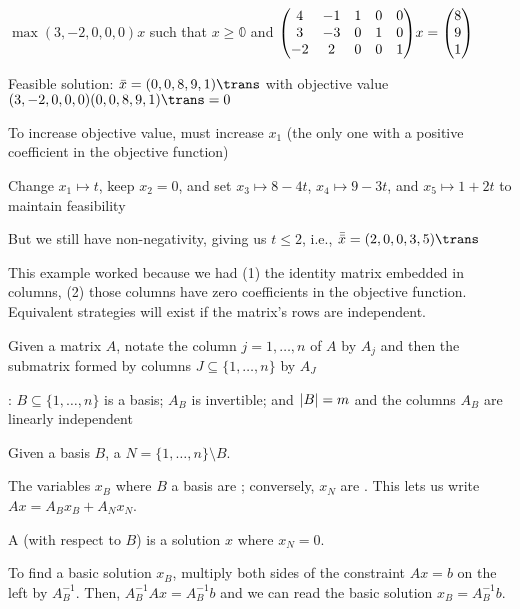 \begin{example}
  $\max (3,-2,0,0,0)x$ such that $x \geq \mathbb 0$
  and $\mqty(4&-1&1&0&0\\3&-3&0&1&0\\-2&2&0&0&1)x=\mqty(8\\9\\1)$
\end{example}
\begin{sol}
  Feasible solution: $\bar x = (0,0,8,9,1)\trans$ with objective value
  $(3,-2,0,0,0)(0,0,8,9,1)\trans = 0$

  To increase objective value, must increase $x_1$ (the only one
  with a positive coefficient in the objective function)

  Change $x_1 \mapsto t$, keep $x_2 = 0$, and set
  $x_3 \mapsto 8-4t$, $x_4 \mapsto 9-3t$, and $x_5 \mapsto 1+2t$
  to maintain feasibility

  But we still have non-negativity, giving us $t \leq 2$, i.e.,
  $\bar{\bar x} = (2,0,0,3,5)\trans$
\end{sol}

This example worked because we had (1) the identity matrix embedded
in columns, (2) those columns have zero coefficients in the
objective function.
Equivalent strategies will exist if the matrix's rows are
independent.

\begin{notation}
  Given a matrix $A$, notate the column $j = 1,\dotsc,n$ of $A$ by
  $A_j$ and then the submatrix formed by columns
  $J \subseteq \{1,\dotsc,n\}$ by $A_J$
\end{notation}

\begin{prop}
  \Tfae: $B \subseteq \{1,\dotsc,n\}$ is a basis;
  $A_B$ is invertible; and
  $\abs{B} = m$ and the columns $A_B$ are linearly independent
\end{prop}

\begin{defn}
  Given a basis $B$, a 
  $N = \{1,\dotsc,n\}\setminus B$.

  The variables $x_B$ where $B$ a basis are ;
  conversely, $x_N$ are .
  This lets us write $Ax = A_Bx_B + A_Nx_N$.

  A  (with respect to $B$) is a solution $x$ where $x_N = 0$.
\end{defn}

To find a basic solution $x_B$, multiply both sides of the
constraint $Ax = b$ on the left by $A_B^{-1}$. Then,
$A_B^{-1}Ax = A_B^{-1}b$ and we can read the basic solution
$x_B = A_B^{-1}b$.


